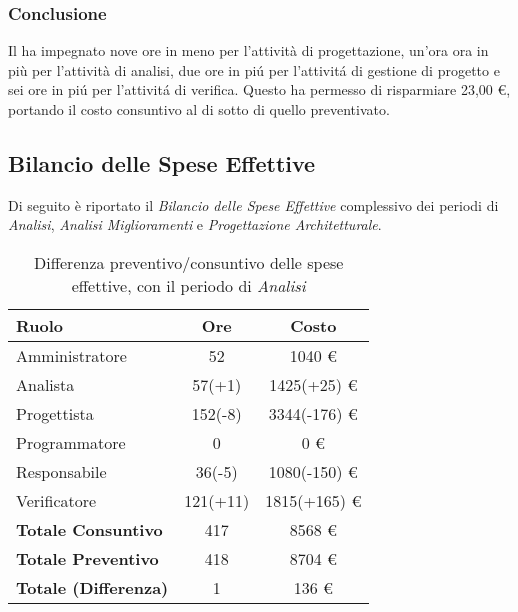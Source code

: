 \subsubsection{Conclusione}
Il  ha impegnato nove ore in meno per l'attivit\`a di progettazione, un'ora ora in più per l'attivit\`a di analisi, due ore in pi\'u per l'attivit\'a di gestione di progetto e sei ore in pi\'u per l'attivit\'a di verifica. Questo ha permesso di risparmiare 23,00 \euro{}, portando il costo consuntivo al di sotto di quello preventivato.

\subsection{Bilancio delle Spese Effettive}
Di seguito è riportato il \textit{Bilancio delle Spese Effettive} complessivo dei periodi di \textit{Analisi}, \textit{Analisi Miglioramenti} e \textit{Progettazione Architetturale}.

\begin{table}[H]
	\centering
	\begin{tabular}{ l c c }
		\textbf{Ruolo} & \textbf{Ore} & \textbf{Costo} \\
		\hline
		Amministratore & 52 & 1040 \euro{} \\
		Analista & 57(+1) & 1425(+25) \euro{} \\
		Progettista & 152(-8) & 3344(-176) \euro{} \\
		Programmatore & 0 & 0 \euro{} \\
		Responsabile & 36(-5) & 1080(-150) \euro{} \\
		Verificatore & 121(+11) & 1815(+165) \euro{} \\
		\hline
		\textbf{Totale Consuntivo} & 417 & 8568 \euro{} \\
		\hline
		\textbf{Totale Preventivo} & 418 & 8704 \euro{} \\
		\hline
		\textbf{Totale (Differenza)} & 1 & 136 \euro{} \\
		\hline
	\end{tabular}
	\caption{Differenza preventivo/consuntivo delle spese effettive, con il periodo di \textit{Analisi}}
\end{table}

